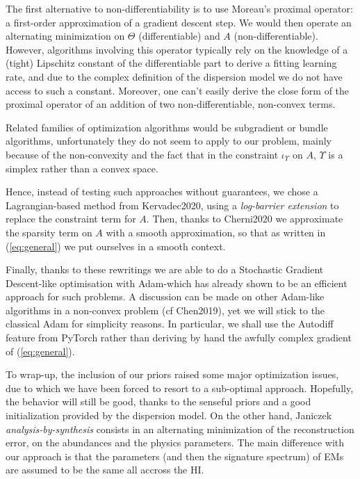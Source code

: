 \documentclass[conference]{IEEEtran}
\begin{document}
The first alternative to non-differentiability is to use Moreau's proximal operator: a first-order approximation of a gradient descent step. We would then operate an alternating minimization on $\Theta$ (differentiable) and $A$ (non-differentiable). However, algorithms involving this operator typically rely on the knowledge of a (tight) Lipschitz constant of the differentiable part to derive a fitting learning rate, and due to the complex definition of the dispersion model we do not have access to such a constant. Moreover, one can't easily derive the close form of the proximal operator of an addition of two non-differentiable, non-convex terms.

Related families of optimization algorithms would be subgradient or bundle algorithms, unfortunately they do not seem to apply to our problem, mainly because of the non-convexity and the fact that in the constraint $\iota_\Upsilon$ on $A$, $\Upsilon$ is a simplex rather than a convex space.

Hence, instead of testing such approaches without guarantees, we chose a Lagrangian-based method from Kervadec2020, using a \emph{log-barrier extension} to replace the constraint term for $A$. Then, thanks to Cherni2020 we approximate the sparsity term on $A$ with a smooth approximation, so that as written in (\ref{eq:general}) we put ourselves in a smooth context.

Finally, thanks to these rewritings we are able to do a Stochastic Gradient Descent-like optimisation with Adam-which has already shown to be an efficient approach for such problems. A discussion can be made on other Adam-like algorithms in a non-convex problem (cf Chen2019), yet we will stick to the classical Adam for simplicity reasons. In particular, we shall use the Autodiff feature from PyTorch rather than deriving by hand the awfully complex gradient of (\ref{eq:general}).

To wrap-up, the inclusion of our priors raised some major optimization issues, due to which we have been forced to resort to a sub-optimal approach. Hopefully, the behavior will still be good, thanks to the senseful priors and a good initialization provided by the dispersion model. On the other hand, Janiczek \emph{analysis-by-synthesis} consists in an alternating minimization of the reconstruction error, on the abundances and the physics parameters. The main difference with our approach is that the parameters (and then the signature spectrum) of EMs are assumed to be the same all accross the HI.
\end{document}
